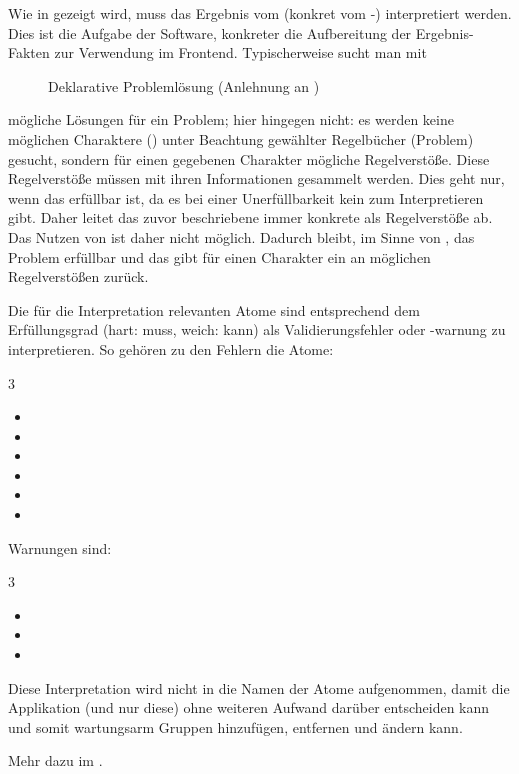 Wie in  gezeigt wird, muss das Ergebnis vom  (konkret vom -) interpretiert werden.
Dies ist die Aufgabe der Software, konkreter die Aufbereitung der Ergebnis-Fakten zur Verwendung im Frontend.
Typischerweise sucht man mit %
\begin{figure}%
    \centering
    \caption{Deklarative Problemlösung (Anlehnung an )}\label{fig:deklarative-problemloesung}
    \vspace{.25em}
\end{figure}%
mögliche Lösungen für ein Problem;
hier hingegen nicht: es werden keine möglichen Charaktere () unter Beachtung gewählter Regelbücher (Problem) gesucht, sondern für einen gegebenen Charakter mögliche Regelverstöße.
Diese Regelverstöße müssen mit ihren Informationen gesammelt werden.
Dies geht nur, wenn das  erfüllbar ist, da es bei einer Unerfüllbarkeit kein  zum Interpretieren gibt.
Daher leitet das zuvor beschriebene  immer konkrete  als Regelverstöße ab.
Das Nutzen von \zB {} ist daher nicht möglich.
Dadurch bleibt, im Sinne von , das Problem erfüllbar und das  gibt für einen Charakter ein  an möglichen Regelverstößen zurück.

Die für die Interpretation relevanten Atome sind entsprechend dem Erfüllungsgrad (hart: muss, weich: kann) als Validierungsfehler oder -warnung zu interpretieren.
So gehören zu den Fehlern die Atome:
\begin{multicols}{3}
    \begin{itemize}
        \item {}
        \item {}
        \item {}
        \item {}
        \item {}
        \item {}
    \end{itemize}
\end{multicols}
Warnungen sind:
\begin{multicols}{3}
    \begin{itemize}
        \item {}
        \item {}
        \item {}
    \end{itemize}
\end{multicols}
Diese Interpretation wird nicht in die Namen der Atome aufgenommen, damit die Applikation (und nur diese) ohne weiteren Aufwand darüber entscheiden kann und somit \zB wartungsarm Gruppen hinzufügen, entfernen und ändern kann.

Mehr dazu im .
